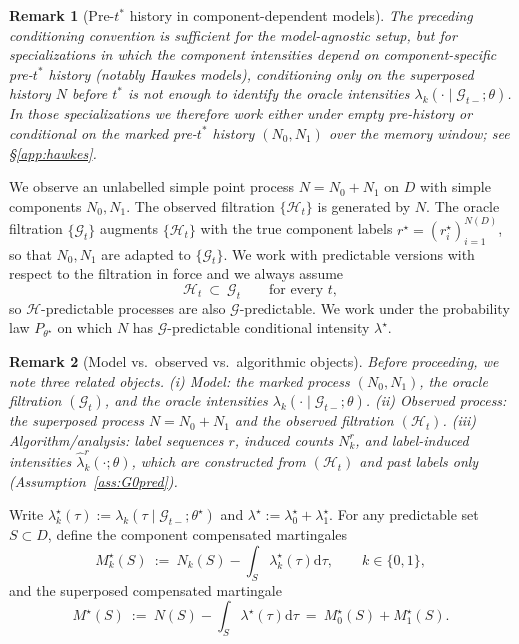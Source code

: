 \documentclass{statsoc}
\newtheorem{remark}[remark]{Remark}
\newcommand{\dd}{\mathrm{d}}
\newcommand{\1}{\mathbbm{1}}
\begin{document}
\begin{remark}[Pre-\(t^\ast\) history in component-dependent models]\label{rem:prehistory-marked}
The preceding conditioning convention is sufficient for the model-agnostic setup, but for specializations in which the component intensities depend on component-specific pre-\(t^\ast\) history (notably Hawkes models), conditioning only on the superposed history \(N\) before \(t^\ast\) is not enough to identify the oracle intensities \(\lambda_k(\cdot\mid\mathcal G_{t-};\theta)\). In those specializations we therefore work either under empty pre-history or conditional on the marked pre-\(t^\ast\) history \((N_0,N_1)\) over the memory window; see \S\ref{app:hawkes}.
\end{remark}



We observe an unlabelled simple point process $N=N_0+N_1$ on $D$ with simple components $N_0,N_1$. The observed filtration $\{\mathcal H_t\}$ is generated by $N$. The oracle filtration $\{\mathcal G_t\}$ augments $\{\mathcal H_t\}$ with the true component labels $r^\star=(r^\star_i)_{i=1}^{N(D)}$, so that $N_0,N_1$ are adapted to $\{\mathcal G_t\}$. We work with predictable versions with respect to the filtration in force and we always assume
\[
\mathcal H_t\ \subset\ \mathcal G_t\qquad\text{for every }t,
\]
so $\mathcal H$-predictable processes are also $\mathcal G$-predictable. We work under the probability law $P_{\theta^\star}$ on which $N$ has $\mathcal G$-predictable conditional intensity $\lambda^\star$.

\begin{remark}[Model vs.\ observed vs.\ algorithmic objects]\label{rem:objects}
Before proceeding, we note three related objects. (i) Model: the marked process $(N_0,N_1)$, the oracle filtration $(\mathcal G_t)$, and the oracle intensities
$\lambda_k(\cdot\mid \mathcal G_{t-};\theta)$. (ii) Observed process: the superposed process $N=N_0+N_1$ and the observed filtration $(\mathcal H_t)$. (iii) Algorithm/analysis: label sequences $r$, induced counts $N_k^r$, and label-induced intensities
$\widehat\lambda_k^r(\cdot;\theta)$, which are constructed from $(\mathcal H_t)$ and past labels only
(Assumption~\ref{ass:G0pred}).
\end{remark}


Write $\lambda_k^\star(\tau):=\lambda_k(\tau\mid \mathcal G_{t-};\theta^\star)$ and $\lambda^\star:=\lambda_0^\star+\lambda_1^\star$. For any predictable set $S\subset D$, define the component compensated martingales
\[
M_k^\star(S)\ :=\ N_k(S) - \int_S \lambda_k^\star(\tau) \dd\tau,\qquad k\in\{0,1\},
\]
and the superposed compensated martingale
\[
M^\star(S)\ :=\ N(S) - \int_S \lambda^\star(\tau) \dd\tau\ =\ M_0^\star(S)+M_1^\star(S).
\]
\end{document}

